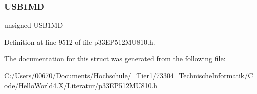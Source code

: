 \subsubsection{\texorpdfstring{U\+S\+B1\+MD}{USB1MD}}
{\footnotesize\ttfamily unsigned U\+S\+B1\+MD}



Definition at line 9512 of file p33\+E\+P512\+M\+U810.\+h.



The documentation for this struct was generated from the following file\+:\begin{DoxyCompactItemize}
\item 
C\+:/\+Users/00670/\+Documents/\+Hochschule/\+\_\+\+Tier1/73304\+\_\+\+Technische\+Informatik/\+Code/\+Hello\+World4.\+X/\+Literatur/\hyperlink{p33_e_p512_m_u810_8h}{p33\+E\+P512\+M\+U810.\+h}\end{DoxyCompactItemize}
